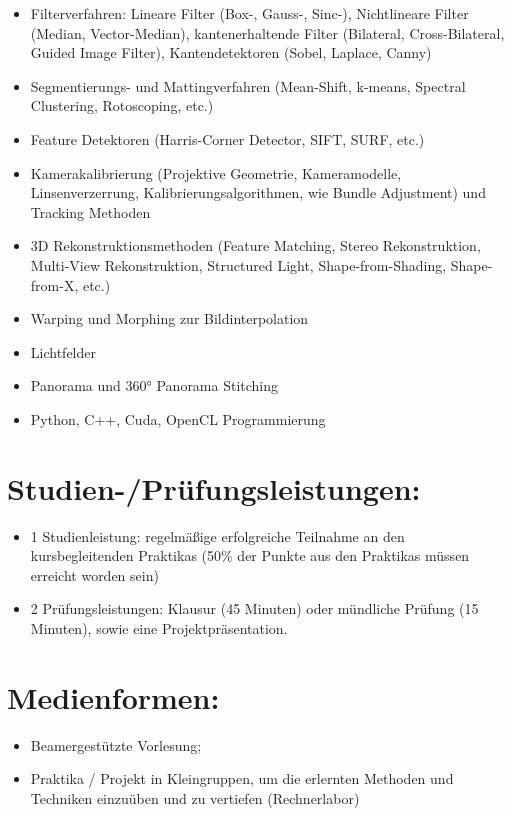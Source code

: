 \begin{itemize}
\tightlist
\item
  Filterverfahren: Lineare Filter (Box-, Gauss-, Sinc-), Nichtlineare
  Filter (Median, Vector-Median), kantenerhaltende Filter (Bilateral,
  Cross-Bilateral, Guided Image Filter), Kantendetektoren (Sobel,
  Laplace, Canny)
\item
  Segmentierungs- und Mattingverfahren (Mean-Shift, k-means, Spectral
  Clustering, Rotoscoping, etc.)
\item
  Feature Detektoren (Harris-Corner Detector, SIFT, SURF, etc.)
\item
  Kamerakalibrierung (Projektive Geometrie, Kameramodelle,
  Linsenverzerrung, Kalibrierungsalgorithmen, wie Bundle Adjustment) und
  Tracking Methoden
\item
  3D Rekonstruktionsmethoden (Feature Matching, Stereo Rekonstruktion,
  Multi-View Rekonstruktion, Structured Light, Shape-from-Shading,
  Shape-from-X, etc.)
\item
  Warping und Morphing zur Bildinterpolation
\item
  Lichtfelder
\item
  Panorama und 360° Panorama Stitching
\item
  Python, C++, Cuda, OpenCL Programmierung
\end{itemize}

\section*{Studien-/Prüfungsleistungen:}\label{studien-pruxfcfungsleistungen-15}

\begin{itemize}
\tightlist
\item
  1 Studienleistung: regelmäßige erfolgreiche Teilnahme an den
  kursbegleitenden Praktikas (50\% der Punkte aus den Praktikas müssen
  erreicht worden sein)
\item
  2 Prüfungsleistungen: Klausur (45 Minuten) oder mündliche Prüfung (15
  Minuten), sowie eine Projektpräsentation.
\end{itemize}

\section*{Medienformen:}\label{medienformen-15}

\begin{itemize}
\tightlist
\item
  Beamergestützte Vorlesung;
\item
  Praktika / Projekt in Kleingruppen, um die erlernten Methoden und
  Techniken einzuüben und zu vertiefen (Rechnerlabor)
\end{itemize}

